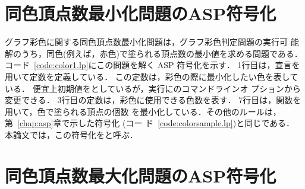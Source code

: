 

\section{同色頂点数最小化問題のASP符号化}



グラフ彩色に関する同色頂点数最小化問題は，グラフ彩色判定問題の実行可
能解のうち，同色(例えば，赤色)で塗られる頂点数の最小値を求める問題である．
%
コード~\ref{code:color1.lp}にこの問題を解く ASP 符号化を示す．
1行目は，宣言を用いて定数を定義している．
この定数は，彩色の際に最小化したい色を表している．
便宜上初期値をとしているが，実行に{\clingo}のコマンドラインオ
プションから変更できる．
3行目の定数は，彩色に使用できる色数を表す．
7行目は，関数を用いて，色で塗られる頂点の個数
を最小化している．その他のルールは，
第~\ref{chap:asp}章で示した符号化 (コー
ド~\ref{code:colorsample.lp})と同じである．
%
本論文では，この符号化をと呼ぶ．

\section{同色頂点数最大化問題のASP符号化}



